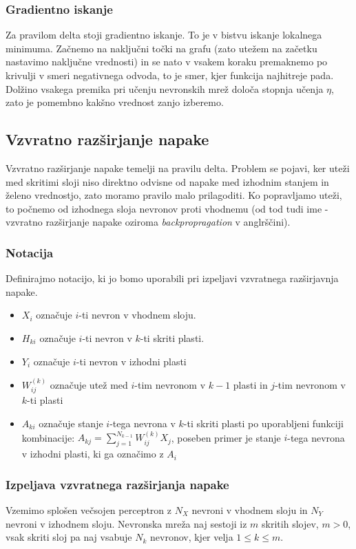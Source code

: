 \documentclass[mat1]{fmfdelo}
\begin{document}
\subsubsection{Gradientno iskanje} 
Za pravilom delta stoji gradientno iskanje. To je v bistvu iskanje lokalnega minimuma. Začnemo na naključni točki na grafu (zato utežem na začetku nastavimo naključne vrednosti) in se nato v vsakem koraku premaknemo po krivulji v smeri negativnega odvoda, to je smer, kjer funkcija najhitreje pada. Dolžino vsakega premika pri učenju nevronskih mrež določa stopnja učenja $\eta$, zato je pomembno kakšno vrednost zanjo izberemo.

\subsection{Vzvratno razširjanje napake}
Vzvratno razširjanje napake temelji na pravilu delta. Problem se pojavi, ker uteži med skritimi sloji niso direktno odvisne od napake med izhodnim stanjem in želeno vrednostjo, zato moramo pravilo malo prilagoditi. Ko popravljamo uteži, to počnemo od izhodnega sloja nevronov proti vhodnemu (od tod tudi ime -  vzvratno razširjanje napake oziroma \emph{backpropragation} v anglrščini). 

\subsubsection{Notacija}
Definirajmo notacijo, ki jo bomo uporabili pri izpeljavi vzvratnega razširjavnja napake. 
\begin{itemize}
\item $X_{i}$ označuje $i$-ti nevron v vhodnem sloju.
\item $H_{ki}$ označuje $i$-ti nevron v $k$-ti skriti plasti.
\item $Y_i$ označuje $i$-ti nevron v izhodni plasti
\item $W^{(k)}_{ij}$ označuje utež med $i$-tim nevronom v  $k-1$ plasti in $j$-tim nevronom v $k$-ti plasti
\item $A_{ki}$ označuje stanje $i$-tega nevrona v $k$-ti skriti plasti po uporabljeni funkciji kombinacije: $A_{kj} = \sum^{N_{k-1}}_{j=1}W^{(k)}_{ij}X_j$, poseben primer je stanje $i$-tega nevrona v izhodni plasti, ki ga označimo z $A_i$
\end{itemize}

\subsubsection{Izpeljava vzvratnega razširjanja napake}
Vzemimo splošen večsojen perceptron z $N_X$ nevroni v vhodnem sloju in $N_Y$ nevroni v izhodnem sloju. Nevronska mreža naj sestoji iz $m$ skritih slojev, $m>0$, vsak skriti sloj pa naj vsabuje $N_k$ nevronov, kjer velja $1\leq k \leq m$. 
\end{document}
